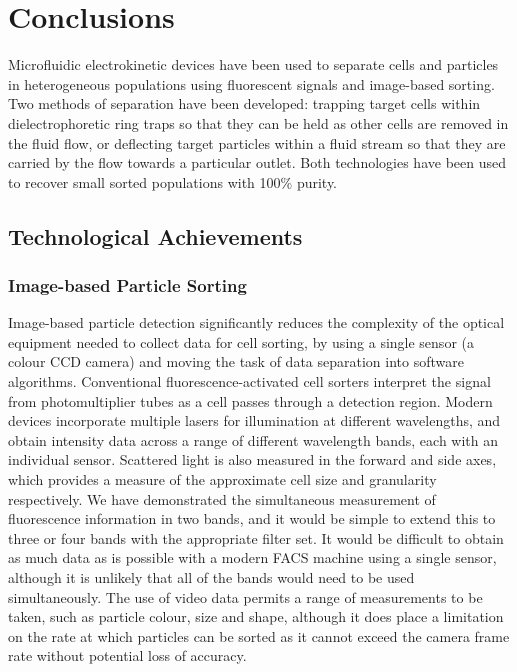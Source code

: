 \chapter{Conclusions} \label{Chapter: Conclusions}

Microfluidic electrokinetic devices have been used to separate cells and particles in heterogeneous populations using fluorescent signals and image-based sorting. Two methods of separation have been developed: trapping target cells within dielectrophoretic ring traps so that they can be held as other cells are removed in the fluid flow, or deflecting target particles within a fluid stream so that they are carried by the flow towards a particular outlet. Both technologies have been used to recover small sorted populations with 100\% purity.

\section{Technological Achievements}

\subsection{Image-based Particle Sorting}

Image-based particle detection significantly reduces the complexity of the optical equipment needed to collect data for cell sorting, by using a single sensor (a colour CCD camera) and moving the task of data separation into software algorithms. Conventional fluorescence-activated cell sorters interpret the signal from photomultiplier tubes as a cell passes through a detection region. Modern devices incorporate multiple lasers for illumination at different wavelengths, and obtain intensity data across a range of different wavelength bands, each with an individual sensor. Scattered light is also measured in the forward and side axes, which provides a measure of the approximate cell size and granularity respectively. We have demonstrated the simultaneous measurement of fluorescence information in two bands, and it would be simple to extend this to three or four bands with the appropriate filter set. It would be difficult to obtain as much data as is possible with a modern FACS machine using a single sensor, although it is unlikely that all of the bands would need to be used simultaneously. The use of video data permits a range of measurements to be taken, such as particle colour, size and shape, although it does place a limitation on the rate at which particles can be sorted as it cannot exceed the camera frame rate without potential loss of accuracy. 

